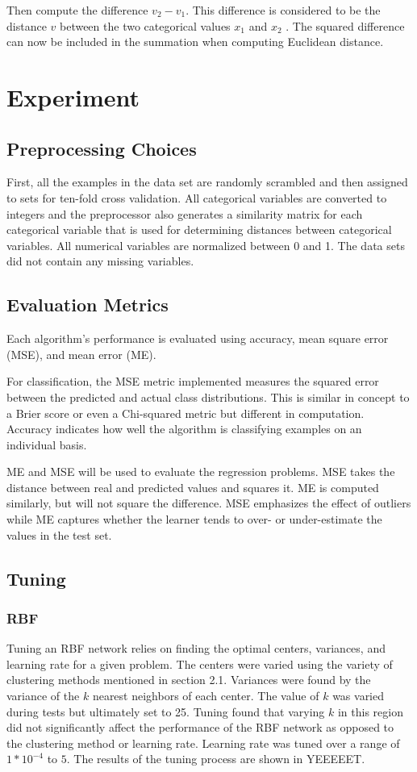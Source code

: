\documentclass[twoside,11pt]{article}
\begin{document}
Then compute the difference
$v_2 - v_1$.
This difference is considered to be the distance $v$ between the two categorical values $x_1$ and $x_2$ \citep{vdm}. The squared difference can now be included in the summation when computing Euclidean distance. %

\section{Experiment}

\subsection{Preprocessing Choices}
First, all the examples in the data set are randomly scrambled and then assigned to sets
for ten-fold cross validation. All categorical variables are converted to integers and the
preprocessor also generates a similarity matrix for each categorical variable that is used for
determining distances between categorical variables. All numerical variables are normalized
between 0 and 1. The data sets did not contain any missing variables.
\subsection{Evaluation Metrics}
Each algorithm's performance is evaluated using accuracy, mean square error (MSE), and mean error (ME).

For classification, the MSE metric implemented measures the squared error between the predicted and actual class distributions. This is similar in concept to a Brier score or even a Chi-squared metric but different in computation.  Accuracy indicates how well the algorithm is classifying examples on an individual basis.

ME and MSE will be used to evaluate the regression problems. MSE takes the distance between real and predicted values and squares it. ME is computed similarly, but will not square the difference. MSE emphasizes the effect of outliers while ME captures whether the learner tends to over- or under-estimate the values in the test set.
\subsection{Tuning}
\subsubsection{RBF}
Tuning an RBF network relies on finding the optimal centers, variances, and learning rate for a given problem. The centers were varied using the variety of clustering methods mentioned in section 2.1. Variances were found by the variance of the $k$ nearest neighbors of each center. The value of $k$ was varied during tests but ultimately set to 25. Tuning found that varying $k$ in this region did not significantly affect the performance of the RBF network as opposed to the clustering method or learning rate. Learning rate was tuned over a range of $1*10^{-4}$ to $5$. The results of the tuning process are shown in YEEEEET. %
\end{document}
